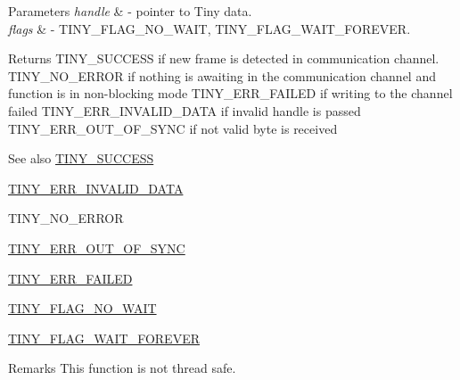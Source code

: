 \begin{DoxyParams}{Parameters}
{\em handle} & -\/ pointer to Tiny data. \\
\hline
{\em flags} & -\/ T\+I\+N\+Y\+\_\+\+F\+L\+A\+G\+\_\+\+N\+O\+\_\+\+W\+A\+IT, T\+I\+N\+Y\+\_\+\+F\+L\+A\+G\+\_\+\+W\+A\+I\+T\+\_\+\+F\+O\+R\+E\+V\+ER. \\
\hline
\end{DoxyParams}
\begin{DoxyReturn}{Returns}
T\+I\+N\+Y\+\_\+\+S\+U\+C\+C\+E\+SS if new frame is detected in communication channel. T\+I\+N\+Y\+\_\+\+N\+O\+\_\+\+E\+R\+R\+OR if nothing is awaiting in the communication channel and function is in non-\/blocking mode T\+I\+N\+Y\+\_\+\+E\+R\+R\+\_\+\+F\+A\+I\+L\+ED if writing to the channel failed T\+I\+N\+Y\+\_\+\+E\+R\+R\+\_\+\+I\+N\+V\+A\+L\+I\+D\+\_\+\+D\+A\+TA if invalid handle is passed T\+I\+N\+Y\+\_\+\+E\+R\+R\+\_\+\+O\+U\+T\+\_\+\+O\+F\+\_\+\+S\+Y\+NC if not valid byte is received
\end{DoxyReturn}
\begin{DoxySeeAlso}{See also}
\hyperlink{group__ERROR__FLAGS_ga16cd043c890ed1fa381b3a20f75a626c}{T\+I\+N\+Y\+\_\+\+S\+U\+C\+C\+E\+SS} 

\hyperlink{group__ERROR__FLAGS_ga541a9e67a84e39595ad647d641c4df2e}{T\+I\+N\+Y\+\_\+\+E\+R\+R\+\_\+\+I\+N\+V\+A\+L\+I\+D\+\_\+\+D\+A\+TA} 

T\+I\+N\+Y\+\_\+\+N\+O\+\_\+\+E\+R\+R\+OR 

\hyperlink{group__ERROR__FLAGS_gae1949de45d9c478830dad9c9b996193a}{T\+I\+N\+Y\+\_\+\+E\+R\+R\+\_\+\+O\+U\+T\+\_\+\+O\+F\+\_\+\+S\+Y\+NC} 

\hyperlink{group__ERROR__FLAGS_ga84e6ca143550038e1a71cf36078d1926}{T\+I\+N\+Y\+\_\+\+E\+R\+R\+\_\+\+F\+A\+I\+L\+ED} 

\hyperlink{group__FLAGS__GROUP_gadadd60eb21d7949e6d097ad36aab9b2e}{T\+I\+N\+Y\+\_\+\+F\+L\+A\+G\+\_\+\+N\+O\+\_\+\+W\+A\+IT} 

\hyperlink{group__FLAGS__GROUP_ga3a34267804581c5709d03f52d232b307}{T\+I\+N\+Y\+\_\+\+F\+L\+A\+G\+\_\+\+W\+A\+I\+T\+\_\+\+F\+O\+R\+E\+V\+ER} 
\end{DoxySeeAlso}
\begin{DoxyRemark}{Remarks}
This function is not thread safe. 
\end{DoxyRemark}
\mbox{\label{group__ADVANCED__API_gaab48caab81a46d74fb52f2afb2649b61}} 
